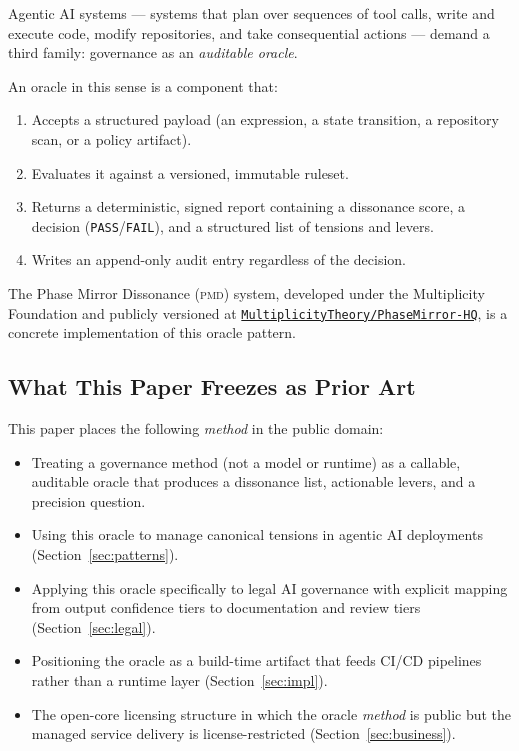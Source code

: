\documentclass[11pt,letterpaper]{article}
\theoremstyle{remark}
\newcommand{\pmd}{\textsc{pmd}}
\begin{document}
Agentic AI systems --- systems that plan over sequences of tool calls,
write and execute code, modify repositories, and take consequential actions
--- demand a third family: governance as an \emph{auditable oracle}.

An oracle in this sense is a component that:
\begin{enumerate}[leftmargin=1.5em]
  \item Accepts a structured payload (an expression, a state transition,
        a repository scan, or a policy artifact).
  \item Evaluates it against a versioned, immutable ruleset.
  \item Returns a deterministic, signed report containing a dissonance
        score, a decision (\texttt{PASS}/\texttt{FAIL}), and a structured
        list of tensions and levers.
  \item Writes an append-only audit entry regardless of the decision.
\end{enumerate}

The Phase Mirror Dissonance (\pmd{}) system, developed under the
Multiplicity Foundation and publicly versioned at
\href{https://github.com/MultiplicityTheory/PhaseMirror-HQ}%
{\texttt{MultiplicityTheory/PhaseMirror-HQ}}, is a concrete implementation
of this oracle pattern.

\subsection{What This Paper Freezes as Prior Art}

This paper places the following \emph{method} in the public domain:

\begin{itemize}[leftmargin=1.5em]
  \item Treating a governance method (not a model or runtime) as a
        callable, auditable oracle that produces a dissonance list,
        actionable levers, and a precision question.
  \item Using this oracle to manage canonical tensions in agentic AI
        deployments (Section~\ref{sec:patterns}).
  \item Applying this oracle specifically to legal AI governance with
        explicit mapping from output confidence tiers to documentation
        and review tiers (Section~\ref{sec:legal}).
  \item Positioning the oracle as a build-time artifact that feeds CI/CD
        pipelines rather than a runtime layer (Section~\ref{sec:impl}).
  \item The open-core licensing structure in which the oracle \emph{method}
        is public but the managed service delivery is license-restricted
        (Section~\ref{sec:business}).
\end{itemize}
\end{document}
